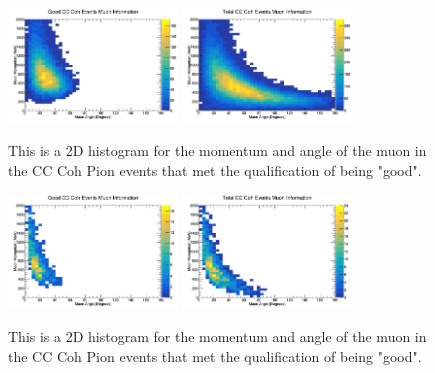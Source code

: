 \documentclass[11pt]{article}
\begin{document}
\begin{figure}[H]
\centering
\includegraphics[width=0.4\textwidth]{OldNMReinSehgalImages/6-GoodCCCohMuonInfoNMORS.png}
\includegraphics[width=0.4\textwidth]{OldNMReinSehgalImages/9-TotalCCCohMuonInfoNMORS.png}
\caption{This is a 2D histogram for the momentum and angle of the muon in the CC Coh Pion events that met the qualification of being "good".}
\end{figure}

\begin{figure}[H]
\centering
\includegraphics[width=0.4\textwidth]{OldNMReinSehgalImages/7.png}
\includegraphics[width=0.4\textwidth]{OldNMReinSehgalImages/8.png}
\caption{This is a 2D histogram for the momentum and angle of the muon in the CC Coh Pion events that met the qualification of being "good".}
\end{figure}


\end{document}
